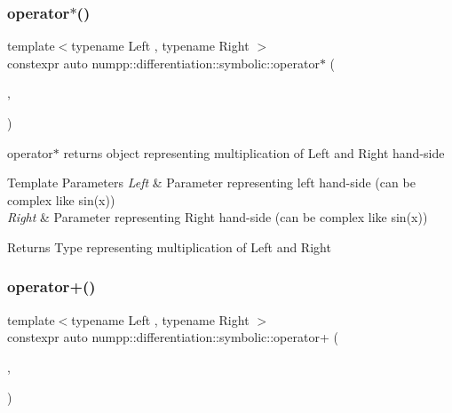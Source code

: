 \subsubsection{\texorpdfstring{operator$\ast$()}{operator*()}}
{\footnotesize\ttfamily template$<$typename Left , typename Right $>$ \\
constexpr auto numpp\+::differentiation\+::symbolic\+::operator$\ast$ (\begin{DoxyParamCaption}\item[{const Left \&}]{,  }\item[{const Right \&}]{ }\end{DoxyParamCaption})}

operator$\ast$ returns object representing multiplication of Left and Right hand-\/side 
\begin{DoxyTemplParams}{Template Parameters}
{\em Left} & Parameter representing left hand-\/side (can be complex like sin(x)) \\
\hline
{\em Right} & Parameter representing Right hand-\/side (can be complex like sin(x))\\
\hline
\end{DoxyTemplParams}
\begin{DoxyReturn}{Returns}
Type representing multiplication of Left and Right
\end{DoxyReturn}
\mbox{\label{group__numpp__differentiation__symbolic_ga45bd7508b366431d72157d0f1ef6fac2}} 
\subsubsection{\texorpdfstring{operator+()}{operator+()}}
{\footnotesize\ttfamily template$<$typename Left , typename Right $>$ \\
constexpr auto numpp\+::differentiation\+::symbolic\+::operator+ (\begin{DoxyParamCaption}\item[{const Left \&}]{,  }\item[{const Right \&}]{ }\end{DoxyParamCaption})}

